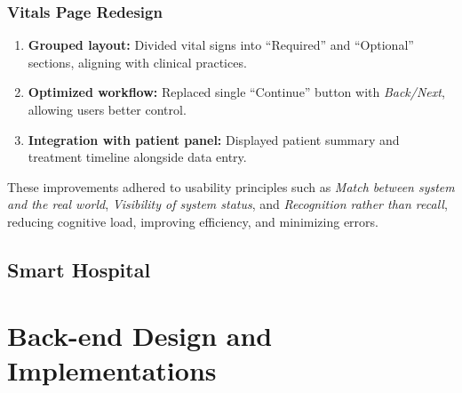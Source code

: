 \subsubsection{Vitals Page Redesign}
\begin{enumerate}
    \item \textbf{Grouped layout:} Divided vital signs into ``Required'' and ``Optional'' sections,
    aligning with clinical practices.
    \item \textbf{Optimized workflow:} Replaced single ``Continue'' button with \emph{Back/Next},
    allowing users better control.
    \item \textbf{Integration with patient panel:} Displayed patient summary and treatment timeline
    alongside data entry.
\end{enumerate}

These improvements adhered to usability principles such as
\emph{Match between system and the real world},
\emph{Visibility of system status}, and
\emph{Recognition rather than recall},
reducing cognitive load, improving efficiency, and minimizing errors.



\subsection{Smart Hospital}
\label{subsec:subsec02}


\section{Back-end Design and Implementations}
\label{sec:sec03}

